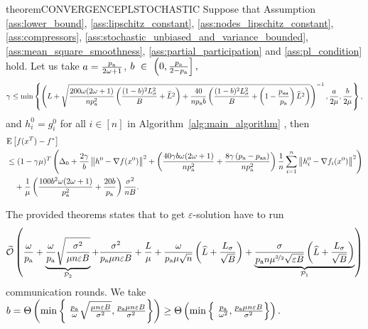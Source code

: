 \documentclass{article}
\newcommand{\algorithmname}{DARIA}
\newcommand*{\probavailable}{\ensuremath{p_{\textnormal{a}}}}
\newcommand*{\probpairaa}{\ensuremath{p_{\textnormal{aa}}}}
\begin{document}
\begin{restatable}{theorem}{CONVERGENCEPLSTOCHASTIC}
  \label{theorem:stochastic_pl}
  Suppose that Assumption \ref{ass:lower_bound}, \ref{ass:lipschitz_constant}, \ref{ass:nodes_lipschitz_constant}, \ref{ass:compressors}, \ref{ass:stochastic_unbiased_and_variance_bounded}, \ref{ass:mean_square_smoothness}, \ref{ass:partial_participation} and \ref{ass:pl_condition} hold. Let us take $a = \frac{\probavailable}{2\omega + 1}$, $b~\in~\left(0, \frac{\probavailable}{2 - \probavailable}\right],$
  $$\gamma \leq \min\left\{\left(L + \sqrt{\frac{200 \omega (2 \omega + 1)}{n \probavailable^2} \left(\frac{(1 - b)^2 L_{\sigma}^2}{B} + \widehat{L}^2\right) + \frac{40}{n \probavailable b}\left(\frac{(1 - b)^2 L_{\sigma}^2}{B} + \left(1 - \frac{\probpairaa}{\probavailable}\right) \widehat{L}^2 \right)}\right)^{-1}, \frac{a}{2\mu} , \frac{b}{2\mu}\right\},$$
  and $h^{0}_i = g^{0}_i$ for all $i \in [n]$ in Algorithm~\ref{alg:main_algorithm} \algname{(\algorithmname-MVR)},
  then 
  \begin{align*}
      &\Exp{f(x^{T}) - f^*} \\
      &\leq (1 - \gamma \mu)^{T}\left(\Delta_0 + \frac{2 \gamma}{b} \norm{h^{0} - \nabla f(x^{0})}^2 + \left(\frac{40 \gamma b \omega (2 \omega + 1)}{n \probavailable^2} + \frac{8 \gamma \left(\probavailable - \probpairaa\right)}{n \probavailable^2}\right)\frac{1}{n}\sum_{i=1}^n\norm{h^{0}_i - \nabla f_i(x^{0})}^2\right) \\
      &\quad + \frac{1}{\mu}\left(\frac{100 b^2 \omega (2 \omega + 1)}{\probavailable^2} + \frac{20 b}{\probavailable}\right) \frac{\sigma^2}{n B}.
  \end{align*}
\end{restatable}

The provided theorems states that to get $\varepsilon$-solution \algname{\algorithmname} have to run
\begin{align}
  \label{eq:pl_compare:new:mvr}
  \widetilde{\cO}\left(\frac{\omega}{\probavailable} + \underbrace{\frac{\omega}{\probavailable}\sqrt{\frac{\sigma^2}{\mu n \varepsilon B}}}_{\mathcal{P}_2} + \frac{\sigma^2}{\probavailable \mu n \varepsilon B} + \frac{L}{\mu} + \frac{\omega}{\probavailable \mu \sqrt{n}} \left(\widehat{L} + \frac{L_{\sigma}}{\sqrt{B}}\right) + \underbrace{\frac{\sigma}{\probavailable n \mu^{\nicefrac{3}{2}} \sqrt{\varepsilon B}}\left(\widehat{L} + \frac{L_{\sigma}}{\sqrt{B}}\right)}_{\mathcal{P}_1}\right)
\end{align}
communication rounds. We take $b = \Theta\left(\min \left\{\ \frac{\probavailable}{\omega} \sqrt{\frac{\mu n \varepsilon B}{\sigma^2}}, \frac{\probavailable \mu n \varepsilon B}{\sigma^2}\right\}\right) \geq \Theta\left(\min \left\{\ \frac{\probavailable}{\omega^2}, \frac{\probavailable \mu n \varepsilon B}{\sigma^2}\right\}\right).$
\end{document}
